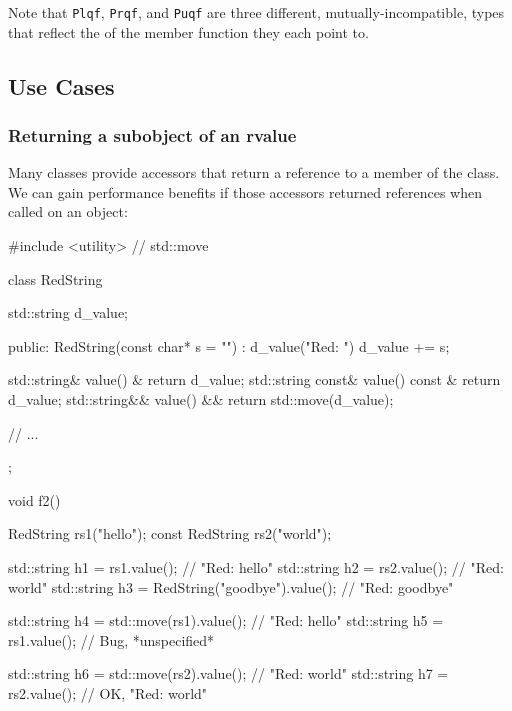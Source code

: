 \noindent Note that \lstinline!Plqf!, \lstinline!Prqf!, and \lstinline!Puqf! are three
different, mutually-incompatible, types that reflect the
 of the member function they each point to.

\subsection[Use Cases]{Use Cases}\label{use-cases-refqualifier}

\subsubsection[Returning a subobject of an \romeovalue{rvalue}]{Returning a subobject of an {\sfbsubsubsecitalRomeo rvalue}}\label{returning-a-subobject-of-an-rvalue}

Many classes provide accessors that return a reference to a member of
the class. We can gain performance benefits if those accessors returned
 references when called on an  object:

\begin{emcppslisting}
#include <utility>  // std::move

class RedString
{
   std::string d_value;

public:
    RedString(const char* s = "") : d_value("Red: ") { d_value += s; }

    std::string&        value() &       { return d_value; }
    std::string const&  value() const & { return d_value; }
    std::string&&       value() &&      { return std::move(d_value); }

    // ...
};

void f2()
{
    RedString       rs1("hello");
    const RedString rs2("world");

    std::string h1 = rs1.value();                   // "Red: hello"
    std::string h2 = rs2.value();                   // "Red: world"
    std::string h3 = RedString("goodbye").value();  // "Red: goodbye"

    std::string h4 = std::move(rs1).value();        // "Red: hello"
    std::string h5 = rs1.value();                   // Bug, *unspecified*

    std::string h6 = std::move(rs2).value();        // "Red: world"
    std::string h7 = rs2.value();                   // OK, "Red: world"
}
\end{emcppslisting}
    

